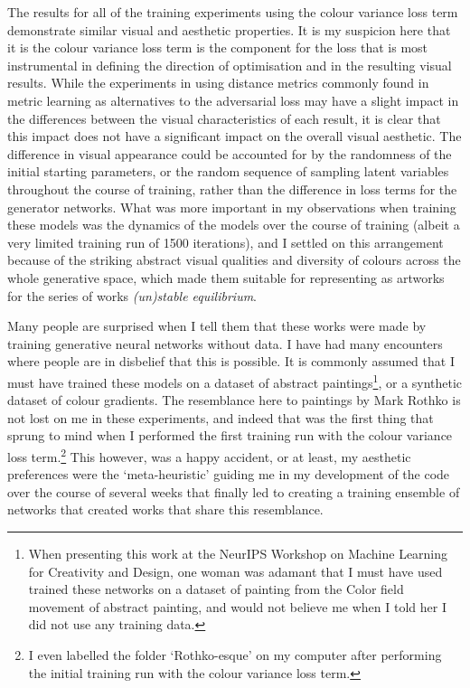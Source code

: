 The results for all of the training experiments using the colour variance loss term demonstrate similar visual and aesthetic properties. 
It is my suspicion here that it is the colour variance loss term is the component for the loss that is most instrumental in defining the direction of optimisation and in the resulting visual results.
While the experiments in using distance metrics commonly found in metric learning as alternatives to the adversarial loss may have a slight impact in the differences between the visual characteristics of each result, it is clear that this impact does not have a significant impact on the overall visual aesthetic.
The difference in visual appearance could be accounted for by the randomness of the initial starting parameters, or the random sequence of sampling latent variables throughout the course of training, rather than the difference in loss terms for the generator networks.
What was more important in my observations when training these models was the dynamics of the models over the course of training (albeit a very limited training run of 1500 iterations), and I settled on this arrangement because of the striking abstract visual qualities and diversity of colours across the whole generative space, which made them suitable for representing as artworks for the series of works \textit{(un)stable equilibrium}. 

Many people are surprised when I tell them that these works were made by training generative neural networks without data.
I have had many encounters where people are in disbelief that this is possible. It is commonly assumed that I must have trained these models on a dataset of abstract paintings\footnote{When presenting this work at the NeurIPS Workshop on Machine Learning for Creativity and Design, one woman was adamant that I must have used trained these networks on a dataset of painting from the Color field movement of abstract painting, and would not believe me when I told her I did not use any training data.}, or a synthetic dataset of colour gradients. 
The resemblance here to paintings by Mark Rothko is not lost on me in these experiments, and indeed that was the first thing that sprung to mind when I performed the first training run with the colour variance loss term.\footnote{I even labelled the folder `Rothko-esque' on my computer after performing the initial training run with the colour variance loss term.} 
This however, was a happy accident, or at least, my aesthetic preferences were the `meta-heuristic' guiding me in my development of the code over the course of several weeks that finally led to creating a training ensemble of networks that created works that share this resemblance.

